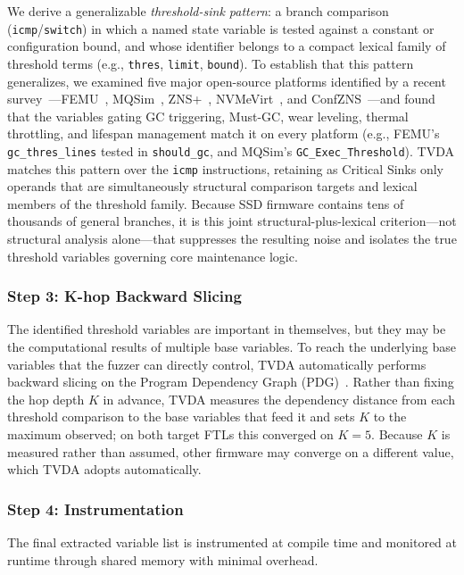 \documentclass[conference]{IEEEtran}
\begin{document}
We derive a generalizable \emph{threshold-sink pattern}: a branch comparison (\texttt{icmp}/\texttt{switch}) in which a named state variable is tested against a constant or configuration bound, and whose identifier belongs to a compact lexical family of threshold terms (e.g., \texttt{thres}, \texttt{limit}, \texttt{bound}).
To establish that this pattern generalizes, we examined five major open-source platforms identified by a recent survey~\cite{gheibi2025survey}---FEMU~\cite{femu}, MQSim~\cite{mqsim}, ZNS+~\cite{znsplus}, NVMeVirt~\cite{nvmevirt}, and ConfZNS~\cite{confzns}---and found that the variables gating GC triggering, Must-GC, wear leveling, thermal throttling, and lifespan management match it on every platform (e.g., FEMU's \texttt{gc\_thres\_lines} tested in \texttt{should\_gc}, and MQSim's \texttt{GC\_Exec\_Threshold}).
TVDA matches this pattern over the \texttt{icmp} instructions, retaining as Critical Sinks only operands that are simultaneously structural comparison targets and lexical members of the threshold family.
Because SSD firmware contains tens of thousands of general branches, it is this joint structural-plus-lexical criterion---not structural analysis alone---that suppresses the resulting noise and isolates the true threshold variables governing core maintenance logic.

\subsubsection*{Step 3: K-hop Backward Slicing}

The identified threshold variables are important in themselves, but they may be the computational results of multiple base variables.
To reach the underlying base variables that the fuzzer can directly control, TVDA automatically performs backward slicing on the Program Dependency Graph (PDG)~\cite{horwitz_pdg}.
Rather than fixing the hop depth $K$ in advance, TVDA measures the dependency distance from each threshold comparison to the base variables that feed it and sets $K$ to the maximum observed; on both target FTLs this converged on $K=5$.
Because $K$ is measured rather than assumed, other firmware may converge on a different value, which TVDA adopts automatically.

\subsubsection*{Step 4: Instrumentation}
The final extracted variable list is instrumented at compile time and monitored at runtime through shared memory with minimal overhead.
\end{document}
